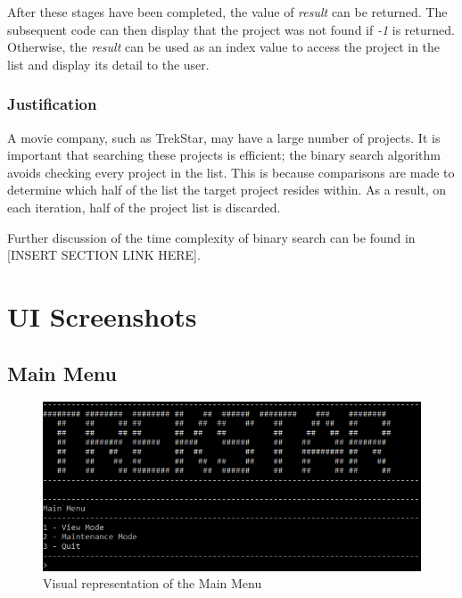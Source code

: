 \documentclass[
  english,
  a4paper,
,tablecaptionabove
]{scrartcl}
\begin{document}
After these stages have been completed, the value of \emph{result} can
be returned. The subsequent code can then display that the project was
not found if \emph{-1} is returned. Otherwise, the \emph{result} can be
used as an index value to access the project in the list and display its
detail to the user.

\hypertarget{justification-1}{%
\subsubsection{Justification}\label{justification-1}}

A movie company, such as TrekStar, may have a large number of projects.
It is important that searching these projects is efficient; the binary
search algorithm avoids checking every project in the list. This is
because comparisons are made to determine which half of the list the
target project resides within. As a result, on each iteration, half of
the project list is discarded.

Further discussion of the time complexity of binary search can be found
in {[}INSERT SECTION LINK HERE{]}.

\newpage

\hypertarget{ui-screenshots}{%
\section{UI Screenshots}\label{ui-screenshots}}

\hypertarget{main-menu}{%
\subsection{Main Menu}\label{main-menu}}

\begin{figure}
\centering
\includegraphics{images/ui-screenshots/main-menu.png}
\caption{Visual representation of the Main Menu}
\end{figure}
\end{document}
